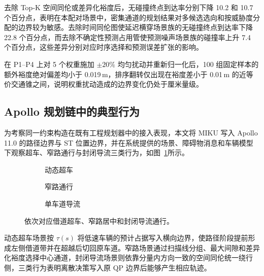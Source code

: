 \documentclass[a4paper,zihao=5]{ctexart}
\theoremstyle{definition}
\begin{document}
去除 Top-K 空间同伦或差异化裕度后，无碰撞终点到达率分别下降 10.2 和 10.7 个百分点，表明在本配对场景中，密集通道的规划结果对多候选选向和按威胁度分配的边界较为敏感。去除时间同伦图使延迟横穿场景族的无碰撞终点到达率下降 22.8 个百分点，而去除不确定性预测占用管使预测噪声场景族的碰撞率上升 7.4 个百分点，这些差异分别对应时序选择和预测误差扩张的影响。

\label{subsec:exp_sensitivity}

在 P1--P4 上对 5 个权重施加 $\pm20\%$ 均匀扰动并重新归一化后，100 组固定样本的额外裕度绝对偏差均小于 0.019\,m，排序翻转仅出现在裕度差小于 0.01\,m 的近等价交通锥之间，说明权重扰动造成的边界变化仍处于厘米量级。

\subsection{Apollo 规划链中的典型行为}
\label{subsec:apollo_hil}

为考察同一约束构造在既有工程规划器中的接入表现，本文将 MIKU 写入 Apollo 11.0 的路径边界与 ST 位置边界，并在系统提供的场景、障碍物消息和车辆模型下观察超车、窄路通行与封闭导流三类行为，如图~\ref{fig:q34_apollo_hil}所示。

\begin{figure}[htbp]
\centering
\begin{subfigure}[b]{0.48\textwidth}
  \centering
  \caption{动态超车}
\end{subfigure}\hfill
\begin{subfigure}[b]{0.48\textwidth}
  \centering
  \caption{窄路通行}
\end{subfigure}\hfill
\par\medskip
\begin{subfigure}[b]{0.72\textwidth}
  \centering
  \caption{单车道导流}
\end{subfigure}
\caption{Apollo 规划链中的三类典型行为}
\caption*{依次对应借道超车、窄路居中和封闭导流通行。}
\label{fig:q34_apollo_hil}
\end{figure}

动态超车场景按 $\tau(s)$ 将低速车辆的预计占据写入横向边界，使路径阶段提前形成左侧借道带并在超越后切回原车道。窄路场景通过扫描线分组、最大间隙和差异化裕度选择中心通道，封闭导流场景则依靠分量内方向一致的空间同伦统一绕行侧，三类行为表明离散决策写入原 QP 边界后能够产生相应轨迹。
\end{document}
